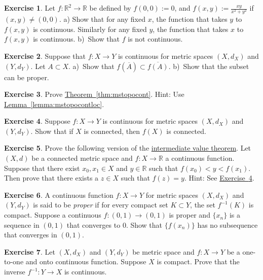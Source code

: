 \documentclass[12pt]{book}
\newcommand{\R}{{\mathbb{R}}}
\newcommand{\myindex}[1]{#1\index{#1}}
\theoremstyle{plain}
\theoremstyle{remark}
\theoremstyle{definition}
\theoremstyle{exercise}
\newtheorem{exercise}{Exercise}[section]
\theoremstyle{example}
\newcommand{\exerciseref}[1]{\hyperref[#1]{Exercise~\ref*{#1}}}
\newcommand{\thmref}[1]{\hyperref[#1]{Theorem~\ref*{#1}}}
\newcommand{\lemmaref}[1]{\hyperref[#1]{Lemma~\ref*{#1}}}
\begin{document}
\begin{exercise} \label{exercise:dicontR2}
Let $f \colon \R^2 \to \R$ be defined by $f(0,0) := 0$, and
$f(x,y) := \frac{xy}{x^2+y^2}$ if $(x,y) \not= (0,0)$.  a) Show that for any fixed $x$,
the function that takes $y$ to $f(x,y)$ is continuous.  Similarly
for any fixed $y$, the function that takes $x$ to $f(x,y)$ is continuous.
b)~Show that $f$ is not continuous.
\end{exercise}

\begin{exercise} 
Suppose that $f \colon X \to Y$ is continuous for metric spaces $(X,d_X)$
and $(Y,d_Y)$.  Let $A \subset X$.  a)~Show that $f(\overline{A}) \subset
\overline{f(A)}$.  b)~Show that the subset can be proper.
\end{exercise}

\begin{exercise}
Prove \thmref{thm:mstopocont}.  Hint: Use \lemmaref{lemma:mstopocontloc}.
\end{exercise}

\begin{exercise} \label{exercise:msconnconn}
Suppose $f \colon X \to Y$ is continuous for metric spaces $(X,d_X)$
and $(Y,d_Y)$.  Show that if $X$ is connected, then $f(X)$ is connected.
\end{exercise}

\begin{exercise}
Prove the following version of the
\hyperref[IVT:thm]{intermediate value theorem}.  Let $(X,d)$ be a connected
metric space and $f \colon X \to \R$ a continuous function.  Suppose that
there exist $x_0,x_1 \in X$ and $y \in \R$ such that $f(x_0) < y < f(x_1)$.
Then prove that there exists a $z \in X$ such that $f(z) = y$.
Hint: See \exerciseref{exercise:msconnconn}.
\end{exercise}

\begin{exercise}
A continuous function $f \colon X \to Y$ for metric spaces $(X,d_X)$ and
$(Y,d_Y)$ is said to be \emph{\myindex{proper}}
if for every compact set $K \subset Y$, the set $f^{-1}(K)$ is compact.
Suppose a continuous $f \colon (0,1) \to (0,1)$ is proper and $\{ x_n
\}$ is a sequence in $(0,1)$ that converges to $0$.  Show that
$\{ f(x_n) \}$ has no subsequence that converges in $(0,1)$.
\end{exercise}

\begin{exercise}
Let $(X,d_X)$ and $(Y,d_Y)$ be metric space and
$f \colon X \to Y$ be a one-to-one and onto continuous function.  Suppose
$X$ is compact.  Prove that the inverse $f^{-1} \colon Y \to X$
is continuous.
\end{exercise}
\end{document}
